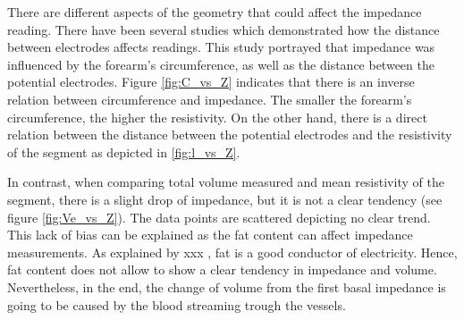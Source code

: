 There are different aspects of the geometry that could affect the impedance reading. There have been several studies which demonstrated how the distance between electrodes affects readings. This study portrayed that impedance was influenced by the forearm's circumference, as well as the distance between the potential electrodes. Figure \ref{fig:C_vs_Z} indicates that there is an inverse relation between circumference and impedance. The smaller the forearm's circumference, the higher the resistivity. On the other hand, there is a direct relation between the distance between the potential electrodes and the resistivity of the segment as depicted in \ref{fig:l_vs_Z}.

In contrast, when comparing total volume measured and mean resistivity of the segment, there is a slight drop of impedance, but it is not a clear tendency (see figure \ref{fig:Ve_vs_Z}). The data points are scattered depicting no clear trend. This lack of bias can be explained as the fat content can affect impedance measurements. As explained by xxx , fat is a good conductor of electricity. Hence, fat content does not allow to show a clear tendency in impedance and volume. Nevertheless, in the end, the change of volume from the first basal impedance is going to be caused by the blood streaming trough the vessels.  

